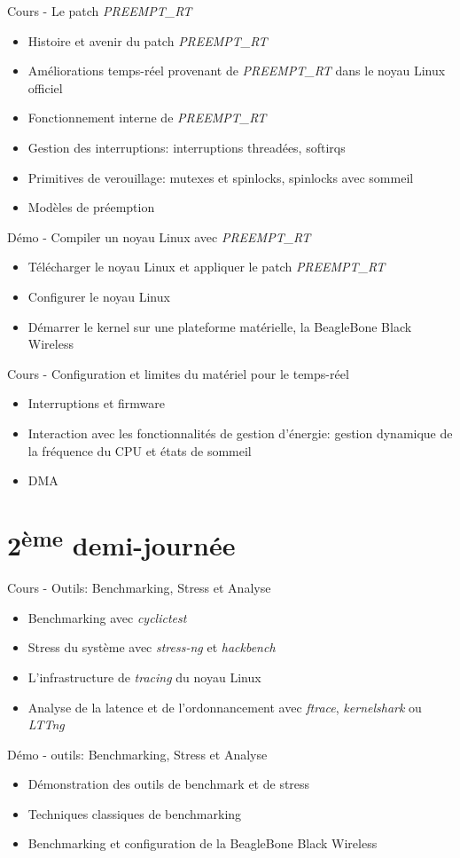 \documentclass[a4paper,12pt,obeyspaces,spaces,hyphens]{article}
\begin{document}
\feagendatwocolumn
{Cours - Le patch {\em PREEMPT\_RT}}
{
  \begin{itemize}
  \item Histoire et avenir du patch {\em PREEMPT\_RT}
  \item Améliorations temps-réel provenant de {\em PREEMPT\_RT} dans le noyau Linux officiel
  \item Fonctionnement interne de {\em PREEMPT\_RT}
  \item Gestion des interruptions: interruptions threadées, softirqs
  \item Primitives de verouillage: mutexes et spinlocks, spinlocks avec sommeil
  \item Modèles de préemption
  \end{itemize}
}
{Démo - Compiler un noyau Linux avec {\em PREEMPT\_RT}}
{
  \begin{itemize}
  \item Télécharger le noyau Linux et appliquer le patch {\em PREEMPT\_RT}
  \item Configurer le noyau Linux
  \item Démarrer le kernel sur une plateforme matérielle, la
    BeagleBone Black Wireless
 \end{itemize}
}

\feagendaonecolumn
{Cours - Configuration et limites du matériel pour le temps-réel}
{
  \begin{itemize}
  \item Interruptions et firmware
  \item Interaction avec les fonctionnalités de gestion d'énergie:
    gestion dynamique de la fréquence du CPU et états de sommeil
  \item DMA
  \end{itemize}
}

\section{2\textsuperscript{ème} demi-journée}

\feagendatwocolumn
{Cours - Outils: Benchmarking, Stress et Analyse}
{
  \begin{itemize}
  \item Benchmarking avec {\em cyclictest}
  \item Stress du système avec {\em stress-ng} et {\em hackbench}
  \item L'infrastructure de {\em tracing} du noyau Linux
  \item Analyse de la latence et de l'ordonnancement avec {\em
      ftrace}, {\em kernelshark} ou {\em LTTng}
  \end{itemize}
}
{Démo - outils: Benchmarking, Stress et Analyse}
{
  \begin{itemize}
  \item Démonstration des outils de benchmark et de stress
  \item Techniques classiques de benchmarking
  \item Benchmarking et configuration de la BeagleBone Black Wireless
  \end{itemize}
}
\end{document}
